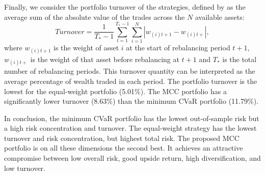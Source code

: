 \documentclass[12pt,a4paper]{article}
\begin{document}

Finally, we consider the portfolio turnover of the strategies, defined by \citet{DeMiguel2009} as the average sum of the absolute value of the trades across the $N$ available assets:
\begin{equation} Turnover = \frac{1}{T_*-1} \sum_{t=1}^{T_*-1} \sum_{i=1}^N | w_{(i)t+1}-w_{(i)t+} |,
\label{eq:turnover} \end{equation}
where $w_{(i)t+1}$ is the weight of asset $i$ at the start of rebalancing period $t+1$, $w_{(i)t+}$ is the weight of that asset before rebalancing at $t+1$ and $T_*$ is the total number of rebalancing periods. This turnover quantity can be interpreted as the average percentage of wealth traded in each period. The portfolio turnover is the lowest for the equal-weight portfolio (5.01\%).  The MCC portfolio has a significantly lower turnover (8.63\%) than the minimum CVaR portfolio (11.79\%).

	In conclusion, the minimum CVaR portfolio has the lowest out-of-sample risk but a high risk concentration and turnover. The equal-weight strategy has the lowest turnover and risk concentration, but highest total risk. The proposed MCC portfolio is on all these dimensions the second best. It achieves an attractive compromise between low overall risk, good upside return, high diversification, and low turnover.
\end{document}
